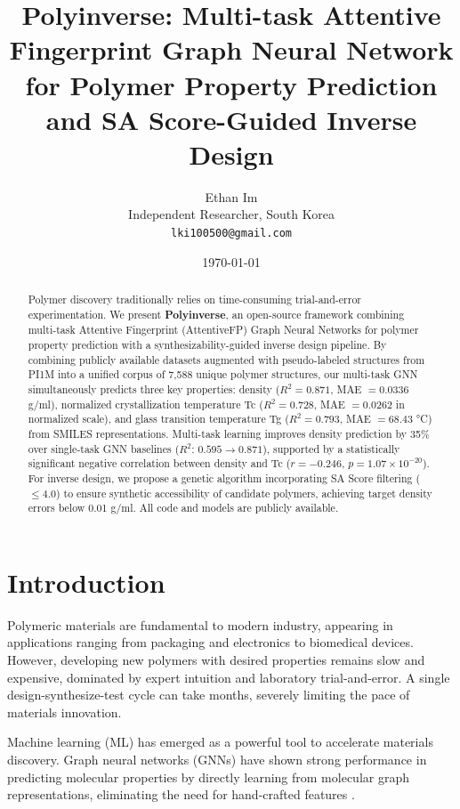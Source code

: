 \documentclass{article}
\title{\textbf{Polyinverse}: Multi-task Attentive Fingerprint Graph Neural Network for Polymer Property Prediction and SA Score-Guided Inverse Design}
\author{
  Ethan Im \\
  Independent Researcher, South Korea \\
  \texttt{lki100500@gmail.com}
}
\date{\today}
\begin{document}
\maketitle

\begin{abstract}
Polymer discovery traditionally relies on time-consuming trial-and-error experimentation.
We present \textbf{Polyinverse}, an open-source framework combining multi-task Attentive Fingerprint (AttentiveFP) Graph Neural Networks for polymer property prediction with a synthesizability-guided inverse design pipeline. By combining publicly available datasets augmented with pseudo-labeled structures from PI1M into a unified corpus of 7,588 unique polymer structures, our multi-task GNN simultaneously predicts three key properties:
density ($R^2 = 0.871$, MAE $= 0.0336$ g/ml), normalized crystallization temperature Tc
($R^2 = 0.728$, MAE $= 0.0262$ in normalized scale), and glass transition temperature Tg
($R^2 = 0.793$, MAE $= 68.43$ °C) from SMILES representations.
Multi-task learning improves density prediction by 35\% over single-task GNN baselines
($R^2$: $0.595 \rightarrow 0.871$), supported by a statistically significant negative
correlation between density and Tc ($r = -0.246$, $p = 1.07 \times 10^{-20}$).
For inverse design, we propose a genetic algorithm incorporating SA Score filtering
($\leq 4.0$) to ensure synthetic accessibility of candidate polymers, achieving target
density errors below 0.01 g/ml. All code and models are publicly available.
\end{abstract}

\section{Introduction}

Polymeric materials are fundamental to modern industry, appearing in applications
ranging from packaging and electronics to biomedical devices. However, developing
new polymers with desired properties remains slow and expensive, dominated by
expert intuition and laboratory trial-and-error. A single design-synthesize-test
cycle can take months, severely limiting the pace of materials innovation.

Machine learning (ML) has emerged as a powerful tool to accelerate materials discovery.
Graph neural networks (GNNs) have shown strong performance in predicting molecular
properties by directly learning from molecular graph representations,
eliminating the need for hand-crafted features \citep{gcnn_polymer_2018}.
\end{document}
